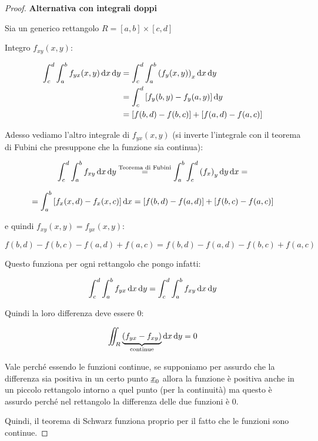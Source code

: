 \pagebreak
\begin{proof} \textbf{Alternativa con integrali doppi}

    Sia un generico rettangolo \(R = [a,b]\times [c,d]\)

    Integro \(f_{xy}(x,y)\):

    \begin{spreadlines}{2mm}
        \begin{align*}
            \int_c^d \int_a^b {f_{yx}(x,y)} \mathop{}\!\mathrm{d}{x}\mathop{}\!\mathrm{d}{y} & = \int_c^d \int_a^b {(f_y(x,y))}_x \mathop{}\!\mathrm{d}{x}\mathop{}\!\mathrm{d}{y}               \\
                                                             & = \int_c^d \left[ f_y(b,y) - f_y(a,y) \right] \mathop{}\!\mathrm{d}{y}            \\
                                                             & = \left[ f(b,d) - f(b,c) \right] + \left[ f(a,d) - f(a,c) \right]
        \end{align*}
    \end{spreadlines}

    Adesso vediamo l'altro integrale di \(f_{yx}(x,y)\) (si inverte l'integrale con il teorema di Fubini che presuppone che la funzione sia continua):

    \[
        \int_c^d \int_a^b f_{xy} \mathop{}\!\mathrm{d}{x}\mathop{}\!\mathrm{d}{y} \overset{\text{Teorema di Fubini}}{=} \int_a^b \int_c^d {(f_x)}_y \mathop{}\!\mathrm{d}{y}\mathop{}\!\mathrm{d}{x} =
    \]

    \[
        =\int_a^b \left[ f_x(x,d) - f_x(x,c) \right] \mathop{}\!\mathrm{d}{x}  = [f(b,d) - f(a,d)] + [f(b,c) - f(a,c)]
    \]

    e quindi \(f_{xy}(x,y) = f_{yx}(x,y)\):

    \[
        f(b,d) - f(b,c) - f(a,d) + f(a,c) = f(b,d) - f(a,d) - f(b,c) + f(a,c)
    \]

    Questo funziona per ogni rettangolo che pongo infatti:

    \[
        \int_c^d \int_a^b f_{yx} \mathop{}\!\mathrm{d}{x}\mathop{}\!\mathrm{d}{y} = \int_c^d \int_a^b f_{xy} \mathop{}\!\mathrm{d}{x}\mathop{}\!\mathrm{d}{y}
    \]

    Quindi la loro differenza deve essere 0:

    \[
        \iint_R \underbrace{{(f_{yx} - f_{xy})}}_\text{continue} \mathop{}\!\mathrm{d}{x}\mathop{}\!\mathrm{d}{y} = 0
    \]

    Vale perché essendo le funzioni continue, se supponiamo per assurdo che la differenza sia positiva in un certo punto \(\underline{x}_0\) allora la funzione è positiva anche in un piccolo rettangolo intorno a quel punto (per la continuità) ma questo è assurdo perché nel rettangolo la differenza delle due funzioni è 0.

    Quindi, il teorema di Schwarz funziona proprio per il fatto che le funzioni sono continue.

\end{proof}

